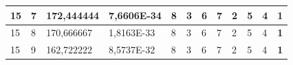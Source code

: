\documentclass[conference]{IEEEtran}
\begin{document}
\begin{table}[]
\begin{tabular}{|llll|llllllll|}
\multicolumn{1}{|l|}{15}                                                    & \multicolumn{1}{l|}{7}                                                        & \multicolumn{1}{l|}{172,444444}                                                   & 7,6606E-34                     & \multicolumn{1}{l|}{8}                                                  & \multicolumn{1}{l|}{3}                                                  & \multicolumn{1}{l|}{6}                                                  & \multicolumn{1}{l|}{7}                                                  & \multicolumn{1}{l|}{2}                                                  & \multicolumn{1}{l|}{5}                                                  & \multicolumn{1}{l|}{4}                                                  & \textbf{1}                 \\ \hline
\multicolumn{1}{|l|}{15}                                                    & \multicolumn{1}{l|}{8}                                                        & \multicolumn{1}{l|}{170,666667}                                                   & 1,8163E-33                     & \multicolumn{1}{l|}{8}                                                  & \multicolumn{1}{l|}{3}                                                  & \multicolumn{1}{l|}{6}                                                  & \multicolumn{1}{l|}{7}                                                  & \multicolumn{1}{l|}{2}                                                  & \multicolumn{1}{l|}{5}                                                  & \multicolumn{1}{l|}{4}                                                  & \textbf{1}                 \\ \hline
\multicolumn{1}{|l|}{15}                                                    & \multicolumn{1}{l|}{9}                                                        & \multicolumn{1}{l|}{162,722222}                                                   & 8,5737E-32                     & \multicolumn{1}{l|}{8}                                                  & \multicolumn{1}{l|}{3}                                                  & \multicolumn{1}{l|}{6}                                                  & \multicolumn{1}{l|}{7}                                                  & \multicolumn{1}{l|}{2}                                                  & \multicolumn{1}{l|}{5}                                                  & \multicolumn{1}{l|}{4}                                                  & \textbf{1}                 \\ \hline

\end{tabular}
\end{table}
\end{document}
